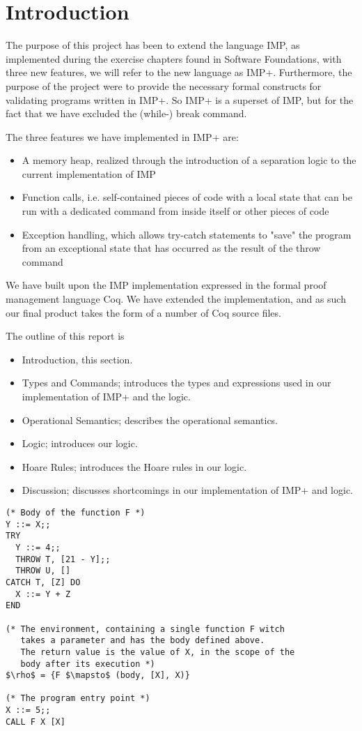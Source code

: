 
\section{Introduction}
The purpose of this project has been to extend the language IMP, as implemented during the exercise chapters found in Software Foundations, with three new features, we will refer to the new language as IMP+. Furthermore, the purpose of the project were to provide the necessary formal constructs for validating programs written in IMP+. So IMP+ is a superset of IMP, but for the fact that we have excluded the (while-) break command.

The three features we have implemented in IMP+ are:
\begin{itemize}
\item A memory heap, realized through the introduction of a separation logic to the current implementation of IMP
\item Function calls, i.e. self-contained pieces of code with a local state that can be run with a dedicated command from inside itself or other pieces of code
\item Exception handling, which allows try-catch statements to "save" the program from an exceptional state that has occurred as the result of the throw command
\end{itemize}

We have built upon the IMP implementation expressed in the formal proof management language Coq. We have extended the implementation, and as such our final product takes the form of a number of Coq source files.

The outline of this report is
\begin{itemize}
\item Introduction, this section.
\item Types and Commands; introduces the types and expressions used in our implementation of IMP+ and the logic.
\item Operational Semantics; describes the operational semantics.
\item Logic; introduces our logic.
\item Hoare Rules; introduces the Hoare rules in our logic.
\item Discussion; discusses shortcomings in our implementation of IMP+ and logic.
\end{itemize}

\begin{lstlisting}[mathescape=true,keepspaces=true,label=lst:imp-plus-ex,caption=A program written in IMP+ demonstrating assignment and throw/catch.]
(* Body of the function F *)
Y ::= X;;
TRY
  Y ::= 4;;
  THROW T, [21 - Y];;
  THROW U, []
CATCH T, [Z] DO
  X ::= Y + Z
END

(* The environment, containing a single function F witch
   takes a parameter and has the body defined above.
   The return value is the value of X, in the scope of the 
   body after its execution *)
$\rho$ = {F $\mapsto$ (body, [X], X)}

(* The program entry point *)
X ::= 5;;
CALL F X [X]
\end{lstlisting}

